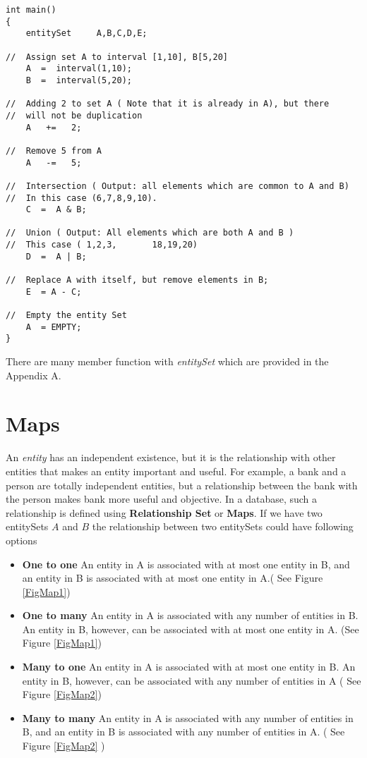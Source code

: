 \begin{verbatim}
int main()
{
    entitySet     A,B,C,D,E;

//  Assign set A to interval [1,10], B[5,20]
    A  =  interval(1,10);
    B  =  interval(5,20);

//  Adding 2 to set A ( Note that it is already in A), but there
//  will not be duplication    
    A   +=   2;

//  Remove 5 from A
    A   -=   5;

//  Intersection ( Output: all elements which are common to A and B)
//  In this case (6,7,8,9,10).
    C  =  A & B;

//  Union ( Output: All elements which are both A and B )
//  This case ( 1,2,3,       18,19,20)
    D  =  A | B;

//  Replace A with itself, but remove elements in B;
    E  = A - C;

//  Empty the entity Set
    A  = EMPTY;
}
\end{verbatim}
\par There are many member function with {\em entitySet} which are provided in the
Appendix A.
\section  { Maps }
An {\em entity} has an independent existence, but it is the relationship 
with other entities that makes an entity important and useful. For example,
a bank and a person are totally independent entities, but a relationship between
the bank with the person makes bank more useful and objective. In a database,
such a relationship is defined using {\bf Relationship Set} or {\bf Maps}. 
If we have two entitySets $A$ and $B$ the relationship between two entitySets
could have following options

\begin{itemize}
\item {\bf One to one} An entity in A is associated with at most one 
entity in B, and an entity in B is associated with at most one entity in A.(
See Figure \ref{FigMap1})
%
\item {\bf One to many} An entity in A is associated with any number of 
entities in B. An entity in B, however, can be associated with at most one
entity in A. (See Figure \ref{FigMap1})
%
\item {\bf Many to one} An entity in A is associated with at most one
entity in B. An entity in B, however, can be associated with any number of
entities in A ( See Figure \ref{FigMap2})
%
\item {\bf Many to many} An entity in A is associated with any number of
entities in B, and an entity in B is associated with any number of 
entities in A. ( See Figure \ref{FigMap2} )
\end{itemize}

